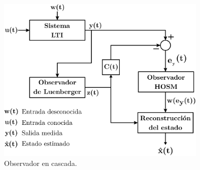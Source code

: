 \documentclass[11pt,letterpaper,twoside,openright]{report}
\begin{document}
	\begin{figure}[hbtp]
	\centering
	\includegraphics[width=10cm]{Capitulo1_CascadaLTI.eps}
	\caption{Observador en cascada.}
	\label{Fig: Capitulo1 - Observador en cascada LTI}
	\end{figure}	 
\end{document}
